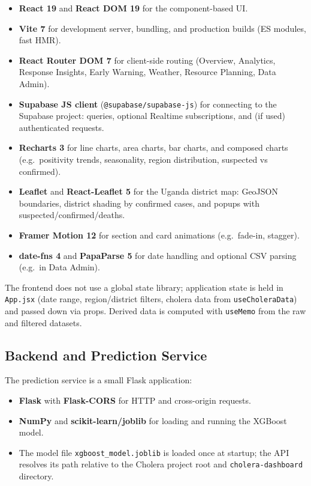 \documentclass[11pt,a4paper]{article}
\begin{document}
\begin{itemize}[noitemsep]
    \item \textbf{React 19} and \textbf{React DOM 19} for the component-based UI.
    \item \textbf{Vite 7} for development server, bundling, and production builds (ES modules, fast HMR).
    \item \textbf{React Router DOM 7} for client-side routing (Overview, Analytics, Response Insights, Early Warning, Weather, Resource Planning, Data Admin).
    \item \textbf{Supabase JS client} (\texttt{@supabase/supabase-js}) for connecting to the Supabase project: queries, optional Realtime subscriptions, and (if used) authenticated requests.
    \item \textbf{Recharts 3} for line charts, area charts, bar charts, and composed charts (e.g.\ positivity trends, seasonality, region distribution, suspected vs confirmed).
    \item \textbf{Leaflet} and \textbf{React-Leaflet 5} for the Uganda district map: GeoJSON boundaries, district shading by confirmed cases, and popups with suspected/confirmed/deaths.
    \item \textbf{Framer Motion 12} for section and card animations (e.g.\ fade-in, stagger).
    \item \textbf{date-fns 4} and \textbf{PapaParse 5} for date handling and optional CSV parsing (e.g.\ in Data Admin).
\end{itemize}

The frontend does not use a global state library; application state is held in \texttt{App.jsx} (date range, region/district filters, cholera data from \texttt{useCholeraData}) and passed down via props. Derived data is computed with \texttt{useMemo} from the raw and filtered datasets.

\subsection{Backend and Prediction Service}

The prediction service is a small Flask application:

\begin{itemize}[noitemsep]
    \item \textbf{Flask} with \textbf{Flask-CORS} for HTTP and cross-origin requests.
    \item \textbf{NumPy} and \textbf{scikit-learn/joblib} for loading and running the XGBoost model.
    \item The model file \texttt{xgboost\_model.joblib} is loaded once at startup; the API resolves its path relative to the Cholera project root and \texttt{cholera-dashboard} directory.
\end{itemize}
\end{document}
